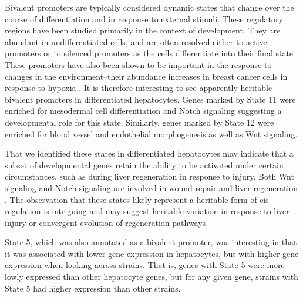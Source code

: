 \documentclass[
  11pt,
]{article}
\begin{document}
Bivalent promoters are typically considered dynamic states that change
over the course of differentiation and in response to external stimuli.
These regulatory regions have been studied primarily in the context of
development. They are abundant in undifferentiated cells, and are often
resolved either to active promoters or to silenced promoters as the
cells differentiate into their final state \citep{pmid23788621, 
pmid22513113}. These promoters have also been shown to be important in
the response to changes in the environment--their abundance increases in
breast cancer cells in response to hypoxia \citep{pmid27800026}. It is
therefore interesting to see apparently heritable bivalent promoters in
differentiated hepatocytes. Genes marked by State 11 were enriched for
mesodermal cell differentiation and Notch signaling suggesting a
developmental role for this state. Similarly, genes marked by State 12
were enriched for blood vessel and endothelial morphogenesis as well as
Wnt signaling.

That we identified these states in differentiated hepatocytes may
indicate that a subset of developmental genes retain the ability to be
activated under certain circumstances, such as during liver regeneration
in response to injury. Both Wnt signaling and Notch signaling are
involved in wound repair \citep{shi2015wnt, 
chigurupati2007involvement, whyte2012wnt} and liver regeneration
\citep{yue2018role, hu2021wnt, thompson2007wnt}. The observation that
these states likely represent a heritable form of cis-regulation is
intriguing and may suggest heritable variation in response to liver
injury or convergent evolution of regeneration pathways.

State 5, which was also annotated as a bivalent promoter, was
interesting in that it was associated with lower gene expression in
hepatocytes, but with higher gene expression when looking across
strains. That is, genes with State 5 were more lowly expressed than
other hepatocyte genes, but for any given gene, strains with State 5 had
higher expression than other strains.
\end{document}
